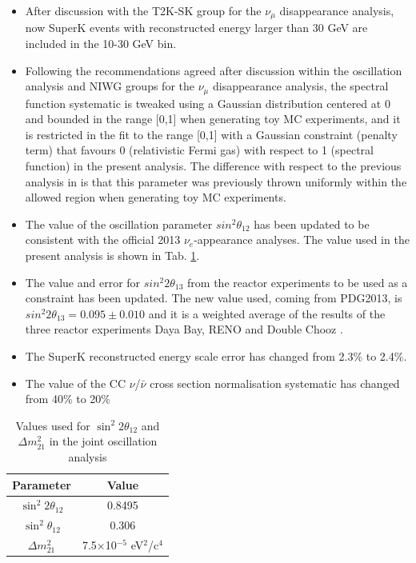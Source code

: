 \begin{itemize}
\item{After discussion with the T2K-SK group for the $\nu_{\mu}$ disappearance analysis, now SuperK events with reconstructed energy larger than 30 GeV are included in the 10-30 GeV bin.}

\item{Following the recommendations agreed after discussion within the oscillation analysis and NIWG groups for the $\nu_{\mu}$ disappearance analysis, the spectral function systematic is tweaked using a Gaussian distribution centered at 0 and bounded in the range [0,1] when generating toy MC experiments, and it is 
restricted in the fit to the range [0,1] with a Gaussian constraint (penalty term) that favours 0 (relativistic Fermi gas) 
with respect to 1 (spectral function) in the present analysis. The difference with respect to the previous analysis in \cite{OurJointAnalysis} is that this parameter was previously thrown uniformly within the allowed region when generating toy MC experiments.}

\item{The value of the oscillation parameter $sin^{2}\theta_{12}$ has been updated to be consistent with the official 2013 $\nu_{e}$-appearance analyses. The value used in the present analysis is shown in Tab. \ref{tab:solarparameters}.}

\item{The value and error for $sin^{2}2\theta_{13}$ from the reactor experiments to be used as a constraint has been updated. The new value used, coming from PDG2013, is $sin^{2}2\theta_{13} = 0.095 \pm 0.010$ and it is a weighted average of the results of the three reactor experiments Daya Bay, RENO and Double Chooz \cite{PDG2013}}.

\item{The SuperK reconstructed energy scale error has changed from 2.3\% to 2.4\%\cite{SuperkEScale2013}.}

\item{The value of the CC $\nu$/$\bar{\nu}$ cross section normalisation systematic has changed from 40\% to 20\%}


\end{itemize}



\begin{table}[h]
\centering
\begin{tabular}{|c|c|}
\hline
Parameter & Value \\
\hline
\hline
$\sin^{2}2\theta_{12}$ & 0.8495 \\
\hline 
$\sin^{2}\theta_{12}$ & 0.306 \\
\hline 
$\Delta m_{21}^{2}$ & 7.5$\times$10$^{-5}$ eV$^{2}$/c$^{4}$ \\
\hline
\end{tabular}
\caption{Values used for $\sin^{2}2\theta_{12}$ and $\Delta m_{21}^{2}$ in the joint oscillation analysis}
\label{tab:solarparameters}
\end{table}



